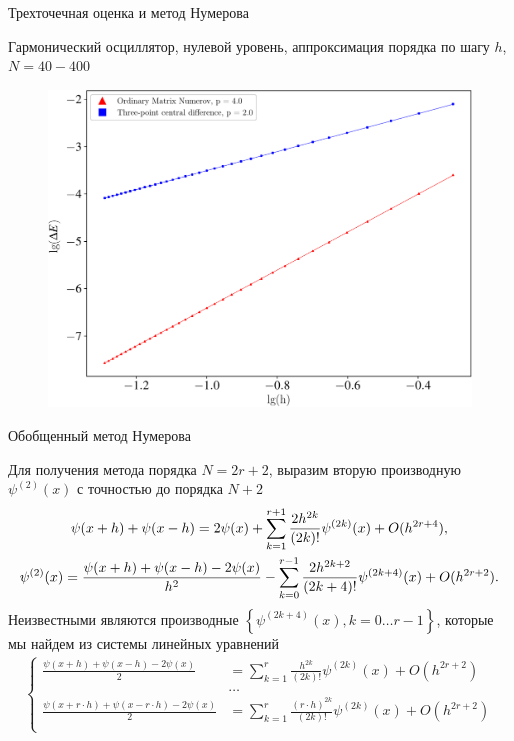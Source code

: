 \documentclass[10pt,pdf,hyperref={unicode},xcolor=dvipsnames]{beamer}
\newcommand{\lc}{\left\{}
\newcommand{\rc}{\right\}}
\newcommand{\psip}[1]{\psi^{(#1)}(x)}
\begin{document}
\begin{frame}{Трехточечная оценка и метод Нумерова}
    \vspace*{-0.35cm}
    \begin{block}{Гармонический осциллятор, нулевой уровень, аппроксимация порядка по шагу $h$, $N = 40-400$}
        \begin{figure}[H]
            \centering
            \includegraphics[width=0.75\linewidth]{./pictures/4numerov_vs_3point-crop.pdf}
        \end{figure}
    \end{block}
\end{frame}

\begin{frame}{Обобщенный метод Нумерова }
    \begin{block}{}
        \vspace*{-0.5cm}
        Для получения метода порядка $N = 2r + 2$, выразим вторую производную $\psip{2}$ с точностью до порядка $N + 2$ 
        \begin{gather}
            \psi(x+h) + \psi(x-h) = 2 \psi(x) + \sum_{k=1}^{r+1} \frac{ 2h^{2k} }{ (2k)! } \psip{2k} + O(h^{2r+4}), \\
            \psip{2} = \frac{ \psi(x+h) + \psi(x-h) - 2\psi(x) }{ h^2 }  - \sum_{k=0}^{r-1} \frac{ 2h^{2k+2} }{ (2k+4)! } \psip{2k+4} + O(h^{2r+2}). \notag
        \end{gather}
        Неизвестными являются производные $\lc \psip{2k + 4}, k = 0 \dots r-1 \rc$, которые мы найдем из системы линейных уравнений
        \begin{gather}
            \lc
            \begin{aligned}
                \frac{ \psi(x+h) + \psi(x-h) - 2\psi(x) }{ 2 } &= \sum_{k=1}^{r} \frac{ h^{2k} }{ (2k)! } \psip{2k} + O(h^{2r+2}) \\ 
                                                               &\dots \\
                \frac{ \psi(x+r\cdot h) + \psi(x-r \cdot h) - 2\psi(x) }{ 2 } &= \sum_{k=1}^{r} \frac{ (r \cdot h)^{2k} }{ (2k)! } \psip{2k} + O(h^{2r+2}) \\ 
            \end{aligned}
            \right.
        \end{gather}
    \end{block}
\end{frame}
\end{document}
